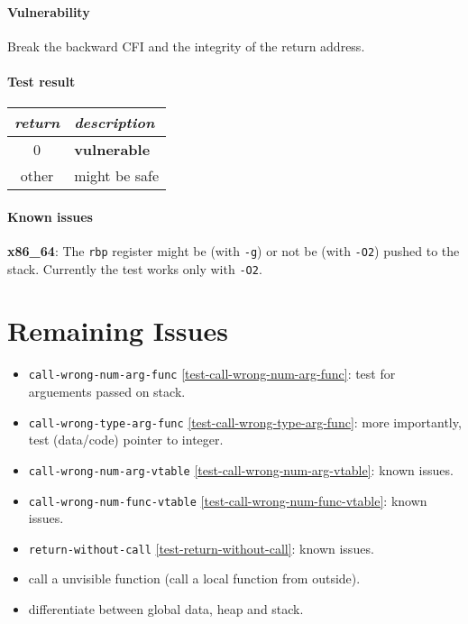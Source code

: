 \documentclass[a4paper]{book}
\begin{document}
\subsubsection{Vulnerability}
Break the backward CFI and the integrity of the return address.

\subsubsection{Test result}
\begin{tabular}{cl}
  \toprule
  \emph{return}  & \emph{description} \\
  \midrule
  0              & \textbf{vulnerable} \\
  other          & might be safe \\
  \bottomrule
\end{tabular}
  
\subsubsection{Known issues}
\textbf{x86\_64}: The \texttt{rbp} register might be (with \texttt{-g}) or not be (with \texttt{-O2}) pushed to the stack.
Currently the test works only with \texttt{-O2}.

\chapter{Remaining Issues}

\begin{itemize}
  \item \texttt{call-wrong-num-arg-func} \ref{test-call-wrong-num-arg-func}: test for arguements passed on stack.
  \item \texttt{call-wrong-type-arg-func} \ref{test-call-wrong-type-arg-func}: more importantly, test (data/code) pointer to integer.
  \item \texttt{call-wrong-num-arg-vtable} \ref{test-call-wrong-num-arg-vtable}: known issues.
  \item \texttt{call-wrong-num-func-vtable} \ref{test-call-wrong-num-func-vtable}: known issues.
  \item \texttt{return-without-call} \ref{test-return-without-call}: known issues.
  \item call a unvisible function (call a local function from outside).
  \item differentiate between global data, heap and stack.
\end{itemize}
\end{document}
